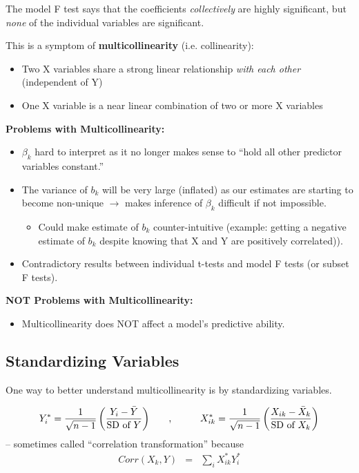 \documentclass[12pt]{notes}
\begin{document}
The model F test says that the coefficients \textit{collectively} are highly significant, but \textit{none} of the individual variables are significant. 

\nspace
This is a symptom of \textbf{multicollinearity} (i.e. collinearity):
\begin{itemize}
\item Two X variables share a strong linear relationship \textit{with each other} (independent of Y)
\item One X variable is a near linear combination of two or more X variables 
\end{itemize}

\textbf{Problems with Multicollinearity:}
\begin{itemize}
\item $\beta_k$ hard to interpret as it no longer makes sense to ``hold all other predictor variables constant.''
\item The variance of $b_k$ will be very large (inflated) as our estimates are starting to become non-unique $\rightarrow$ makes inference of $\beta_k$ difficult if not impossible. 
\begin{itemize}
\item Could make estimate of $b_k$ counter-intuitive (example: getting a negative estimate of $b_k$ despite knowing that X and Y are positively correlated)). 
\end{itemize}
\item Contradictory results between individual t-tests and model F tests (or subset F tests). 
\end{itemize}

\textbf{NOT Problems with Multicollinearity:}
\begin{itemize}
\item Multicollinearity does NOT affect a model's predictive ability. 
\end{itemize}

\subsection{Standardizing Variables}
One way to better understand multicollinearity is by standardizing variables. 

\begin{eqnarray}
Y^*_{i} = \frac{1}{\sqrt{n-1}} \left( \frac{Y_{i} - \bar{Y}}{\mbox{SD of $Y$}} \right)
 & \mbox{\hspace{2em},\hspace{2em}} &
X^*_{ik} = \frac{1}{\sqrt{n-1}} \left( \frac{X_{ik} - \bar{X}_k}{\mbox{SD of $X_k$}} \right)  \nonumber
\end{eqnarray}
-- sometimes called ``correlation transformation'' because
\begin{eqnarray}
  Corr(X_k,Y) & = & \sum_i X^*_{ik} Y^*_i \nonumber
\end{eqnarray}
\end{document}
